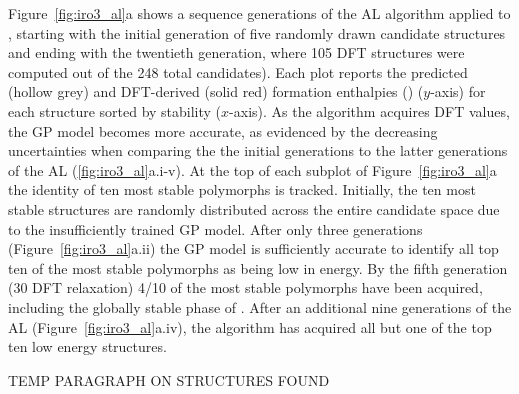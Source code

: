 %
Figure~\ref{fig:iro3_al}a shows a sequence generations of the AL algorithm applied to \IrOthree,
starting with the initial generation of five randomly drawn candidate structures and ending with the twentieth generation, where \num{105} DFT structures were computed out of the \num{248} total candidates).
%
Each plot reports the predicted (hollow grey) and DFT-derived (solid red) formation enthalpies (\DHf) ($y$-axis) for each structure sorted by stability ($x$-axis).
%
As the algorithm acquires DFT \DHf values, the GP model becomes more accurate, as evidenced by the decreasing uncertainties when comparing the the initial generations to the latter generations of the AL (\ref{fig:iro3_al}a.i-v).
%
At the top of each subplot of Figure~\ref{fig:iro3_al}a the identity of ten most stable polymorphs is tracked.
%
Initially, the ten most stable structures are randomly distributed across the entire candidate space due to the insufficiently trained GP model.
%
After only three generations (Figure~\ref{fig:iro3_al}a.ii) the GP model is sufficiently accurate to identify all top ten of the most stable polymorphs as being low in energy.
%
By the fifth generation (\num{30} DFT relaxation) \num{4/10} of the most stable polymorphs have been acquired,
including the globally stable phase of \IrOthree.
%
After an additional nine generations of the AL
(Figure~\ref{fig:iro3_al}a.iv),
the algorithm has acquired all but one of the top ten low energy structures.


%
TEMP PARAGRAPH ON STRUCTURES FOUND



